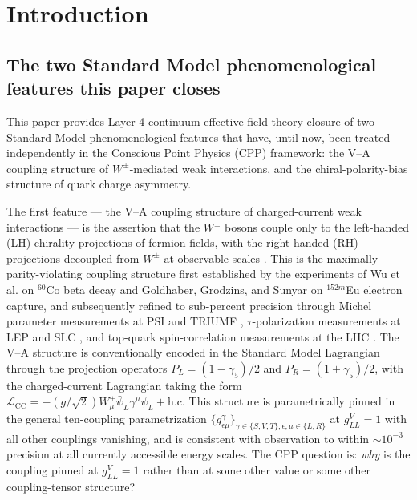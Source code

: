 \documentclass[11pt,letterpaper]{article}
\begin{document}
\section{Introduction}
\label{sec:introduction}

\subsection{The two Standard Model phenomenological features this paper closes}
\label{sec:two_features}

This paper provides Layer 4 continuum-effective-field-theory closure of two Standard Model phenomenological features that have, until now, been treated independently in the Conscious Point Physics (CPP) framework: the V--A coupling structure of $W^\pm$-mediated weak interactions, and the chiral-polarity-bias structure of quark charge asymmetry.

The first feature --- the V--A coupling structure of charged-current weak interactions --- is the assertion that the $W^\pm$ bosons couple only to the left-handed (LH) chirality projections of fermion fields, with the right-handed (RH) projections decoupled from $W^\pm$ at observable scales \cite{CommonsBucksbaum, ChengLi, Peskin}. This is the maximally parity-violating coupling structure first established by the experiments of Wu et al. \cite{Wu1957} on $^{60}$Co beta decay and Goldhaber, Grodzins, and Sunyar \cite{Goldhaber1958} on $^{152m}$Eu electron capture, and subsequently refined to sub-percent precision through Michel parameter measurements at PSI and TRIUMF \cite{TWISTrho, Michel1950, MarcianoSirlin1988}, $\tau$-polarization measurements at LEP and SLC \cite{LEPElectroweak}, and top-quark spin-correlation measurements at the LHC \cite{ATLASTopSpin, CMSTopSpin}. The V--A structure is conventionally encoded in the Standard Model Lagrangian through the projection operators $P_L = (1-\gamma_5)/2$ and $P_R = (1+\gamma_5)/2$, with the charged-current Lagrangian taking the form $\mathcal{L}_{\text{CC}} = -(g/\sqrt{2}) W^+_\mu \bar{\psi}_L \gamma^\mu \psi_L + \text{h.c.}$ This structure is parametrically pinned in the general ten-coupling parametrization $\{g^\gamma_{\epsilon\mu}\}_{\gamma \in \{S,V,T\}; \epsilon,\mu \in \{L,R\}}$ at $g^V_{LL} = 1$ with all other couplings vanishing, and is consistent with observation to within $\sim 10^{-3}$ precision at all currently accessible energy scales. The CPP question is: \emph{why} is the coupling pinned at $g^V_{LL} = 1$ rather than at some other value or some other coupling-tensor structure?
\end{document}
